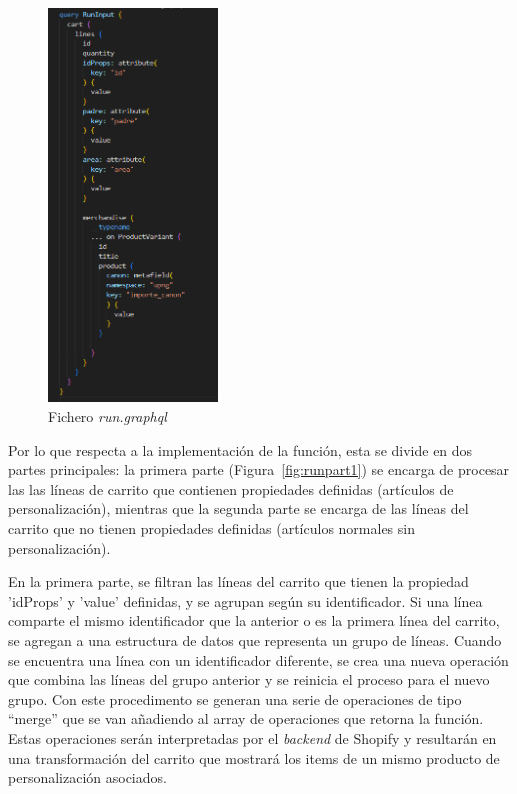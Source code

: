 \documentclass[11pt]{article}
\begin{document}
\begin{figure}[H]
    \centering
    \includegraphics[width=0.4\textwidth]{imagenes-tema/queryCartTransform.png}
    \caption{\label{fig:queryCart} Fichero \textit{run.graphql}}
    \vspace{\fill}
\end{figure}

Por lo que respecta a la implementación de la función, esta se divide en dos partes principales: la primera parte (Figura~\ref{fig:runpart1})  se encarga de procesar las las líneas de carrito que contienen
propiedades definidas (artículos de personalización), mientras que la segunda parte se encarga de las líneas del carrito que no tienen propiedades definidas (artículos normales sin personalización).

En la primera parte, se filtran las líneas del carrito que tienen la propiedad 'idProps' y 'value' definidas, y se agrupan según su identificador. Si una línea comparte el mismo identificador que la anterior
o es la primera línea del carrito, se agregan a una estructura de datos que representa un grupo de líneas. Cuando se encuentra una línea con un identificador diferente, se crea una nueva operación 
que combina las líneas del grupo anterior y se reinicia el proceso para el nuevo grupo. Con este procedimento se generan una serie de operaciones de tipo ``merge'' que se van añadiendo al array de operaciones que retorna 
la función. Estas operaciones serán interpretadas por el \textit{backend} de Shopify y resultarán en una transformación del carrito que mostrará los items de un mismo producto de personalización asociados.
\end{document}
